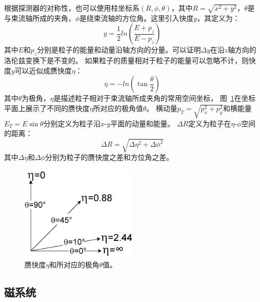 根据探测器的对称性，也可以使用柱坐标系$(R,\phi,\theta)$，其中$R=\sqrt{x^2+y^2}$，$\theta$是与束流轴所成的夹角，$\phi$是绕束流轴的方位角。这里引入快度$y$，其定义为：
\begin{equation} 
\label{eq:ydef}
y=\frac{1}{2}ln\left( \frac{E+p_{z}}{E-p_{z}} \right)
\end{equation}
其中$E$和$p_{z}$分别是粒子的能量和动量沿轴方向的分量。可以证明$\Delta y$在沿$z$轴方向的洛伦兹变换下是不变的。
如果粒子的质量相对于粒子的能量可以忽略不计，则快度$y$可以近似成赝快度$\eta$：
\begin{equation} 
\label{eq:etadef}
\eta=-ln\left(\tan\frac{\theta}{2} \right)
\end{equation}
其中$\theta$为极角，$\eta$是描述粒子相对于束流轴所成夹角的常用空间坐标，
图~\ref{fig:ATLAS4}在坐标平面上展示了不同的赝快度$\eta$所对应的极角值$\theta$。
横动量$p_{T}=\sqrt{p_x^2+p_y^2}$和横能量$E_{T}=E\sin\theta$分别定义为粒子沿$x$-$y$平面的动量和能量。
$\Delta R$定义为粒子在$\eta$-$\phi$空间的距离：
\begin{equation} 
\label{eq:DRdef}
\Delta R=\sqrt{\Delta\eta^2+\Delta\phi^2}
\end{equation}
其中$\Delta\eta$和$\Delta\phi$分别为粒子的赝快度之差和方位角之差。

\begin{figure}
  \begin{center}
    \includegraphics[width=0.5\textwidth]{figuresEXP/ATLAS4.png}
  \end{center}
  \caption{
赝快度$\eta$和所对应的极角$\theta$值。
  }
    \label{fig:ATLAS4}
\end{figure}


\subsection{磁系统}
\label{sec:ATLASMS}

